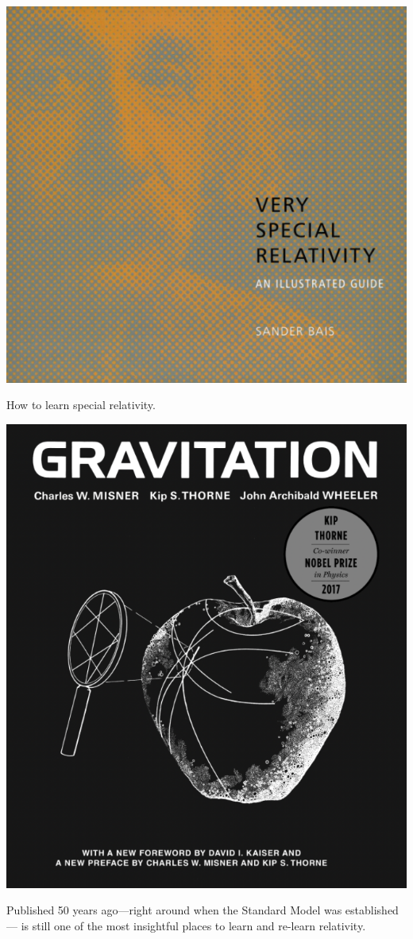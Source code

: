 \begin{marginfigure}%
    \includegraphics[width=.8\textwidth]{figures/vsr_cover.png}
    \caption{How to learn special relativity.}
    \label{fig:VSR:cover}
\end{marginfigure}
\begin{marginfigure}%
    \includegraphics[width=.8\textwidth]{figures/MSW_cover.png}
    \caption{Published 50 years ago---right around when the Standard Model was established--- is still one of the most insightful places to learn and re-learn relativity. }
    \label{fig:MTW:cover}
\end{marginfigure}

